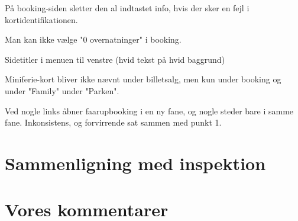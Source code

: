 \documentclass[10pt,a4paper]{article}      %
\begin{document}
På booking-siden sletter den al indtastet info, hvis der sker en fejl i
kortidentifikationen.

Man kan ikke vælge "0 overnatninger" i booking.

Sidetitler i menuen til venstre (hvid tekst på hvid baggrund)

Miniferie-kort bliver ikke nævnt under billetsalg, men kun under booking og
under "Family" under "Parken".

Ved nogle links åbner faarupbooking i en ny fane, og nogle steder bare i samme
fane. Inkonsistens, og forvirrende sat sammen med punkt 1.

\section{Sammenligning med inspektion}
\label{apx:sammenligning-inspektion}

\section{Vores kommentarer}
\label{apx:vores-kommentarer}
\end{document}
